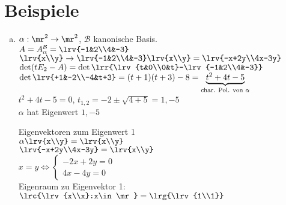 \section{Beispiele}
  \begin{enumerate}[a)]
    \item $\alpha:\mr^2\rightarrow\mr^2$, $\mathcal{B}$ kanonische Basis.\\
      $A=A_\alpha^{\mathcal{B}}=\lrv{-1&2\\4&-3}$\\
      $\lrv{x\\y}\rightarrow\lrv{-1&2\\4&-3}\lrv{x\\y}=\lrv{-x+2y\\4x-3y}$\\
      $\det(tE_2-A)=\det\lrr{\lrv{t&0\\0&t}-\lrv{-1&2\\4&-3}}$\\
      $\det\lrv{+1&-2\\-4&t+3}=(t+1)(t+3)-8=\underbrace{t^2+4t-5}_{\mbox{\scriptsize
        char. Pol. von }\alpha}$\\
      $t^2+4t-5=0$, $t_{1,2}=-2\pm\sqrt{4+5}=1,-5$\\
      $\alpha$ hat Eigenwert $1,-5$

      Eigenvektoren zum Eigenwert 1\\
      $\alpha\lrv{x\\y}=\lrv{x\\y}$\\
      $\lrv{-x+2y\\4x-3y}=\lrv{x\\y}$\\
      $x=y\Leftrightarrow\begin{cases}-2x+2y=0\\4x-4y=0\end{cases}$\\
      Eigenraum zu Eigenvektor 1: $\lrc{\lrv{x\\x}:x\in\mr}=\lrg{\lrv{1\\1}}$


\end{enumerate}
